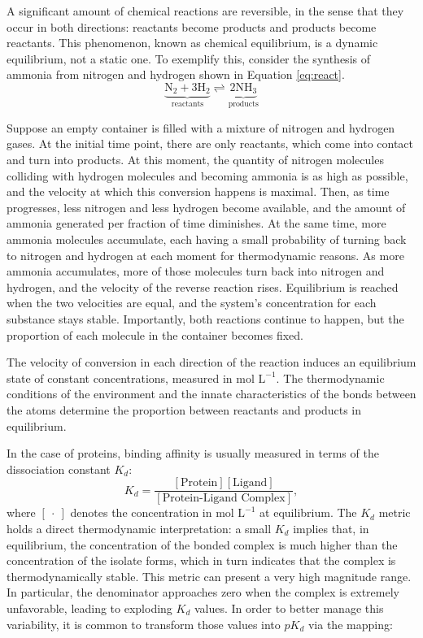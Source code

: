 \documentclass[a4paper,12pt]{article}
\begin{document}
A significant amount of chemical reactions are reversible, in the sense that they occur in both directions: reactants become products and products become reactants. This phenomenon, known as chemical equilibrium, is a dynamic equilibrium, not a static one. To exemplify this, consider the synthesis of ammonia from nitrogen and hydrogen shown in Equation \ref{eq:react}.
\begin{equation}\label{eq:react}
    \underbrace{\text{N}_2 + 3\text{H}_2}_{\text{reactants}} \rightleftharpoons \underbrace{2\text{NH}_3}_{\text{products}}
\end{equation}

Suppose an empty container is filled with a mixture of nitrogen and hydrogen gases. At the initial time point, there are only reactants, which come into contact and turn into products. At this moment, the quantity of nitrogen molecules colliding with hydrogen molecules and becoming ammonia is as high as possible, and the velocity at which this conversion happens is maximal. Then, as time progresses, less nitrogen and less hydrogen become available, and the amount of ammonia generated per fraction of time diminishes. At the same time, more ammonia molecules accumulate, each having a small probability of turning back to nitrogen and hydrogen at each moment for thermodynamic reasons. As more ammonia accumulates, more of those molecules turn back into nitrogen and hydrogen, and the velocity of the reverse reaction rises. Equilibrium is reached when the two velocities are equal, and the system's concentration for each substance stays stable. Importantly, both reactions continue to happen, but the proportion of each molecule in the container becomes fixed.

The velocity of conversion in each direction of the reaction induces an equilibrium state of constant concentrations, measured in $\text{mol L}^{-1}$. The thermodynamic conditions of the environment and the innate characteristics of the bonds between the atoms determine the proportion between reactants and products in equilibrium.

In the case of proteins, binding affinity is usually measured in terms of the dissociation constant $K_d$:
\begin{equation*}
    K_d = \frac{[\text{Protein}][\text{Ligand}]}{[\text{Protein-Ligand Complex}]},
\end{equation*}
where $[\ \cdot\ ]$ denotes the concentration in $\text{mol L}^{-1}$ at equilibrium. The $K_d$ metric holds a direct thermodynamic interpretation: a small $K_d$ implies that, in equilibrium, the concentration of the bonded complex is much higher than the concentration of the isolate forms, which in turn indicates that the complex is thermodynamically stable. This metric can present a very high magnitude range. In particular, the denominator approaches zero when the complex is extremely unfavorable, leading to exploding $K_d$ values. In order to better manage this variability, it is common to transform those values into $pK_d$ via the mapping:
\end{document}
